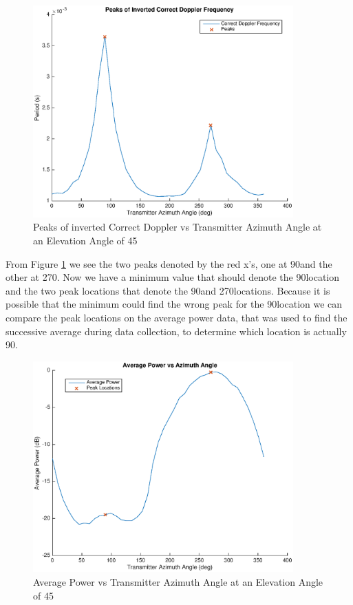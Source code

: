 \begin{figure}
	\begin{center}
		\includegraphics[width=10cm]{images/results/Correct_doppler_inverse_peaks.eps}
		\caption{Peaks of inverted Correct Doppler vs Transmitter Azimuth Angle at an Elevation Angle of 45\textdegree}
		\label{fig:peaks}
	\end{center}
\end{figure}

From Figure \ref{fig:peaks}  we see the two peaks denoted by the red x's, one at 90\textdegree \space and the other at  270\textdegree. Now we have a minimum value that should denote the 90\textdegree \space location and the two peak locations that denote the 90\textdegree \space and 270\textdegree \space locations. Because it is possible that the minimum could find the wrong peak for the 90\textdegree \space location we can compare the peak locations on the average power data, that was used to find the successive average during data collection, to determine which location is actually 90\textdegree.

\begin{figure}
	\begin{center}
		\includegraphics[width=10cm]{images/results/average_power_vs_Azimuth.eps}
		\caption{Average Power vs Transmitter Azimuth Angle at an Elevation Angle of 45\textdegree}
		\label{fig:ave_power}
	\end{center}
\end{figure}

